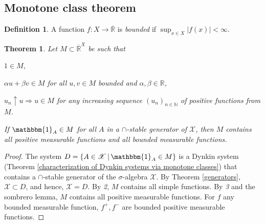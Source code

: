 \documentclass[11pt, a4paper, openany]{book}
\newtheorem{thm}{Theorem}\newtheorem{lem}{Lemma}\newtheorem{crl}{Corollary}
\theoremstyle{definition}
\newtheorem{define}{Definition}\newtheorem{exam}{Example}\newtheorem{remark}{Remark}
\newcommand{\er}{\overline{\mathbb{R}}}
\newenvironment{tight_enumerate}{\begin{enumerate}\itemsep -0.2em}{\end{enumerate}}
\begin{document}
\subsection{Monotone class theorem}
    \begin{define}
        A function $f:X\rightarrow \er$ is \textit{bounded} if $\sup_{x\in X}|f(x)|<\infty$.
    \end{define}
    \begin{thm}\label{monotone class theorem}
        Let $M\subset \er^X$ be such that
        \begin{tight_enumerate}
            \item $1\in M$,
            \item $\alpha u+\beta v\in M$ for all $u,v\in M$ bounded and $\alpha,\beta\in\mathbb{R}$,
            \item $u_n\uparrow u\Rightarrow u\in M$ for any increasing sequence $(u_n)_{n\in\mathbb{N}}$ of positive functions from $M$.
        \end{tight_enumerate}
        If $\mathbbm{1}_A\in M$ for all $A$ in a $\cap$-stable generator of $\mathscr{X}$,
        then $M$ contains all positive measurable functions and all bounded measurable functions.
    \end{thm}
    \begin{proof}
        The system $D=\{A\in\mathscr{X}\,|\,\mathbbm{1}_A\in M\}$ is a Dynkin system (Theorem \ref{characterization of Dynkin systems via monotone classes}) that contains a $\cap$-stable generator of the $\sigma$-algebra $\mathscr{X}$. By Theorem \ref{generators}, $\mathscr{X}\subset D$, and hence, $\mathscr{X}=D$. By \textit{2}, $M$ contains all simple functions. By \textit{3} and the sombrero lemma, $M$ contains all positive measurable functions. For $f$ any bounded measurable function, $f^+,f^-$ are bounded positive measurable functions.
    \end{proof}
\end{document}
